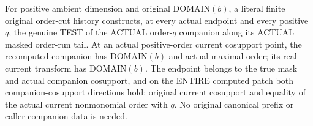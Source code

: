 \begin{theorem}
\label{hir:original-finite-order-cut-current-companion-tests}
\leanok
For positive ambient dimension and original DOMAIN$(b)$, a literal finite
original order-cut history constructs, at every actual endpoint and every
positive $q$, the genuine TEST of the ACTUAL order-$q$ companion along
its ACTUAL masked order-run tail. At an actual positive-order current
cosupport point, the recomputed companion has DOMAIN$(b)$ and actual
maximal order; its real current transform has DOMAIN$(b)$. The endpoint
belongs to the true mask and actual companion cosupport, and on the ENTIRE
computed patch both companion-cosupport directions hold: original current
cosupport and equality of the actual current nonmonomial order with $q$.
No original canonical prefix or caller companion data is needed.
\end{theorem}
